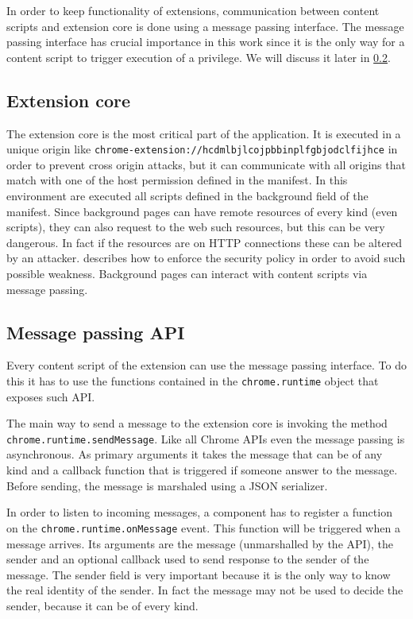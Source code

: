 In order to keep functionality of extensions, communication between content scripts and extension core is done using a message passing interface. The message passing interface has crucial importance in this work since it is the only way for a content script to trigger execution of a privilege. We will discuss it later in \ref{subs:MPI}.

\subsection{Extension core}
The extension core is the most critical part of the application. It is executed in a unique origin like \texttt{chrome-extension://hcdmlbjlcojpbbinplfgbjodclfijhce} in order to prevent cross origin attacks, but it can communicate with all origins that match with one of the host permission defined in the manifest. In this environment are executed all scripts defined in the background field of the manifest. Since background pages can have remote resources of every kind (even scripts), they can also request to the web such resources, but this can be very dangerous. In fact if the resources are on HTTP connections these can be altered by an attacker. \cite{ChromeExtSpecSnd} describes how to enforce the security policy in order to avoid such possible weakness. Background pages can interact with content scripts via message passing.

\subsection{Message passing API}
\label{subs:MPI}
Every content script of the extension can use the message passing interface. To do this it has to use the functions contained in the \texttt{chrome.runtime} object \cite{ChromeExtensionRuntime} that exposes such API.

The main way to send a message to the extension core is invoking the method \texttt{chrome.runtime.sendMessage}. Like all Chrome APIs even the message passing is asynchronous. As primary arguments it takes the message that can be of any kind and a callback function that is triggered if someone answer to the message. Before sending, the message is marshaled using a JSON serializer.

In order to listen to incoming messages, a component has to register a function on the \texttt{chrome.runtime.onMessage} event. This function will be triggered when a message arrives. Its arguments are the message (unmarshalled by the API), the sender and an optional callback used to send response to the sender of the message. The sender field is very important because it is the only way to know the real identity of the sender. In fact the message may not be used to decide the sender, because it can be of every kind.

